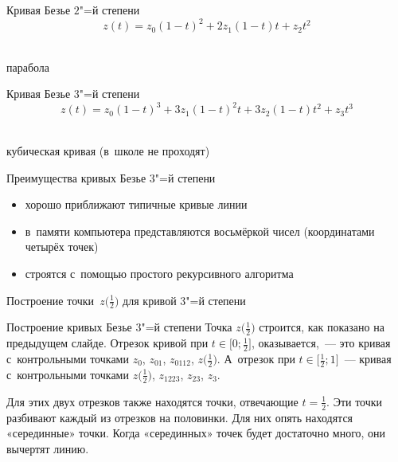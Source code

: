 \begin{frame}{Кривая Безье $2$"=й степени}
	\[
	z(t)=z_0(1-t)^2+2z_1(1-t)t+z_2t^2
	\]
\begin{center}
\\[4ex]
парабола
\end{center}
\end{frame}

\begin{frame}{Кривая Безье $3$"=й степени}
	\[
	z(t)=z_0(1-t)^3+3z_1(1-t)^2t+3z_2(1-t)t^2+z_3t^3
	\]
\begin{center}
\\[4ex]
кубическая кривая (в~школе не проходят)
\end{center}
\end{frame}

\begin{frame}{Преимущества кривых Безье $3$"=й степени}
\begin{itemize}
\item
хорошо приближают типичные кривые линии
\item
в~памяти компьютера представляются восьмёркой чисел (координатами четырёх
точек)
\item
строятся с~помощью простого рекурсивного алгоритма
\end{itemize}
\end{frame}

\begin{frame}{Построение точки~$z\bigl(\frac12\bigr)$ для кривой $3$"=й
степени}
\begin{center}

\end{center}
\end{frame}

\begin{frame}{Построение кривых Безье $3$"=й степени}
Точка $z\bigl(\frac12\bigr)$ строится, как показано на предыдущем слайде.
Отрезок кривой при $t\in\bigl[0;\frac12\bigr]$, оказывается,~— это кривая
с~контрольными точками $z_0$, $z_{01}$, $z_{0112}$, $z\bigl(\frac12\bigr)$.
А~отрезок при $t\in\bigl[\frac12;1\bigr]$~— кривая с~контрольными точками
$z\bigl(\frac12\bigr)$, $z_{1223}$, $z_{23}$, $z_3$.

Для этих двух отрезков также находятся точки, отвечающие $t=\frac12$. Эти точки
разбивают каждый из отрезков на половинки. Для них опять находятся «серединные»
точки. Когда «серединных» точек будет достаточно много, они вычертят линию.
\end{frame}


